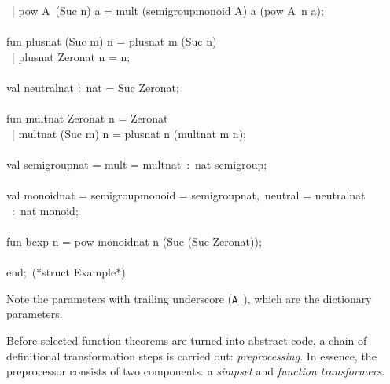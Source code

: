 \begin{isabellebody}
\begin{isamarkuptext}
\hspace*{0pt} ~| pow A{}~(Suc n) a = mult (semigroup{}monoid A{}) a (pow A{}~n a);\\
\hspace*{0pt}\\
\hspace*{0pt}fun plus{}nat (Suc m) n = plus{}nat m (Suc n)\\
\hspace*{0pt} ~| plus{}nat Zero{}nat n = n;\\
\hspace*{0pt}\\
\hspace*{0pt}val neutral{}nat :~nat = Suc Zero{}nat;\\
\hspace*{0pt}\\
\hspace*{0pt}fun mult{}nat Zero{}nat n = Zero{}nat\\
\hspace*{0pt} ~| mult{}nat (Suc m) n = plus{}nat n (mult{}nat m n);\\
\hspace*{0pt}\\
\hspace*{0pt}val semigroup{}nat = {}mult = mult{}nat{}~:~nat semigroup;\\
\hspace*{0pt}\\
\hspace*{0pt}val monoid{}nat = {}semigroup{}monoid = semigroup{}nat,~neutral = neutral{}nat{}\\
\hspace*{0pt} ~:~nat monoid;\\
\hspace*{0pt}\\
\hspace*{0pt}fun bexp n = pow monoid{}nat n (Suc (Suc Zero{}nat));\\
\hspace*{0pt}\\
\hspace*{0pt}end;~(*struct Example*)%
\end{isamarkuptext}%
\isamarkuptrue%
%
\endisatagquote
{\isafoldquote}%
%
\isadelimquote
%
\endisadelimquote
%
\begin{isamarkuptext}%
\noindent Note the parameters with trailing underscore (\verb|A_|),
    which are the dictionary parameters.%
\end{isamarkuptext}%
\isamarkuptrue%
%
\isamarkuptrue%
%
\begin{isamarkuptext}%
Before selected function theorems are turned into abstract
  code, a chain of definitional transformation steps is carried
  out: \emph{preprocessing}.  In essence, the preprocessor
  consists of two components: a \emph{simpset} and \emph{function transformers}.


\end{isamarkuptext}
\end{isabellebody}
